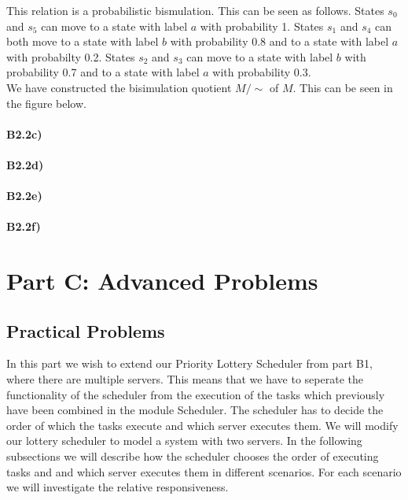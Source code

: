 \documentclass[12pt]{report}
\begin{document}
This relation is a probabilistic bismulation. This can be seen as follows. States $s_0$ and $s_5$ can move to a state with label $a$ with probability 1. States $s_1$ and $s_4$ can both move to a state with label $b$ with probability 0.8 and to a state with label $a$ with probabilty 0.2. States $s_2$ and $s_3$ can move to a state with label $b$ with probability 0.7 and to a state with label $a$ with probability 0.3.\\
We have constructed the bisimulation quotient $M / \sim$ of $M$. This can be seen in the figure below.\\

\subsubsection*{B2.2c)}
\subsubsection*{B2.2d)}
\subsubsection*{B2.2e)}
\subsubsection*{B2.2f)}

\chapter*{Part C: Advanced Problems}
\section*{Practical Problems}
In this part we wish to extend our Priority Lottery Scheduler from part B1, where there are multiple servers. This means that we have to seperate the functionality of the scheduler from the execution of the tasks which previously have been combined in the module Scheduler. The scheduler has to decide the order of which the tasks execute and which server executes them. We will modify our lottery scheduler to model a system with two servers. In the following subsections we will describe how the scheduler chooses the order of executing tasks and and which server executes them in different scenarios. For each scenario we will investigate the relative responsiveness.
\end{document}
